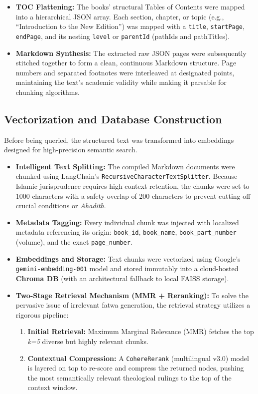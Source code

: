 \begin{itemize}
    \item \textbf{TOC Flattening:} The books' structural Tables of Contents were mapped into a hierarchical JSON array. Each section, chapter, or topic (e.g., ``Introduction to the New Edition'') was mapped with a \texttt{title}, \texttt{startPage}, \texttt{endPage}, and its nesting \texttt{level} or \texttt{parentId} (pathIds and pathTitles).
    \item \textbf{Markdown Synthesis:} The extracted raw JSON pages were subsequently stitched together to form a clean, continuous Markdown structure. Page numbers and separated footnotes were interleaved at designated points, maintaining the text's academic validity while making it parsable for chunking algorithms.
\end{itemize}

\subsection{Vectorization and Database Construction}
Before being queried, the structured text was transformed into embeddings designed for high-precision semantic search.

\begin{itemize}
    \item \textbf{Intelligent Text Splitting:} The compiled Markdown documents were chunked using LangChain's \texttt{RecursiveCharacterTextSplitter}. Because Islamic jurisprudence requires high context retention, the chunks were set to 1000 characters with a safety overlap of 200 characters to prevent cutting off crucial conditions or \textit{Ahadith}.
    \item \textbf{Metadata Tagging:} Every individual chunk was injected with localized metadata referencing its origin: \texttt{book\_id}, \texttt{book\_name}, \texttt{book\_part\_number} (volume), and the exact \texttt{page\_number}.
    \item \textbf{Embeddings and Storage:} Text chunks were vectorized using Google's \texttt{gemini-embedding-001} model and stored immutably into a cloud-hosted \textbf{Chroma DB} (with an architectural fallback to local FAISS storage).
    \item \textbf{Two-Stage Retrieval Mechanism (MMR + Reranking):} To solve the pervasive issue of irrelevant fatwa generation, the retrieval strategy utilizes a rigorous pipeline:
    \begin{enumerate}
        \item \textbf{Initial Retrieval:} Maximum Marginal Relevance (MMR) fetches the top \textit{k=5} diverse but highly relevant chunks.
        \item \textbf{Contextual Compression:} A \texttt{CohereRerank} (multilingual v3.0) model is layered on top to re-score and compress the returned nodes, pushing the most semantically relevant theological rulings to the top of the context window.
    \end{enumerate}
\end{itemize}

